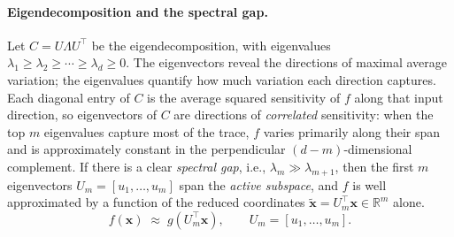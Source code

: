 \documentclass[11pt,a4paper]{report}
\newcommand{\x}{\bm{x}}
\newcommand{\R}{\mathbb{R}}
\begin{document}
\paragraph{Eigendecomposition and the spectral gap.}
Let $C = U \Lambda U^\top$ be the eigendecomposition, with eigenvalues $\lambda_1 \geq \lambda_2 \geq \cdots \geq \lambda_d \geq 0$.  The eigenvectors reveal the directions of maximal average variation; the eigenvalues quantify how much variation each direction captures.  Each diagonal entry of $C$ is the average squared sensitivity of $f$ along that input direction, so eigenvectors of $C$ are directions of \emph{correlated} sensitivity: when the top $m$ eigenvalues capture most of the trace, $f$ varies primarily along their span and is approximately constant in the perpendicular $(d-m)$-dimensional complement.  If there is a clear \emph{spectral gap}, i.e., $\lambda_m \gg \lambda_{m+1}$, then the first $m$ eigenvectors $U_m = [u_1, \ldots, u_m]$ span the \emph{active subspace}, and $f$ is well approximated by a function of the reduced coordinates $\tilde{\x} = U_m^\top \x \in \R^m$ alone.
\begin{equation}
f(\x) \;\approx\; g(U_m^\top \x),
\qquad U_m = [u_1,\ldots,u_m].
\label{eq:linear_as_ansatz}
\end{equation}
\end{document}
